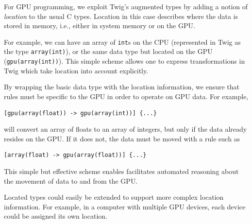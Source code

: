 For GPU programming, we exploit Twig's augmented types by adding a notion of
\emph{location} to the usual C types. Location in this case describes where the
data is stored in memory, i.e., either in system memory or on the GPU. 

For example, we can have an array of \texttt{int}s on the CPU (represented in
Twig as the type \texttt{array(int)}), or the same data type but located on the
GPU (\texttt{gpu(array(int))}). This simple scheme allows one to express
transformations in Twig which take location into account explicitly.

By wrapping the basic data type with the location information, we ensure that
rules must be specific to the GPU in order to operate on GPU data. For example,

\begin{verbatim}
[gpu(array(float)) -> gpu(array(int))] {...}
\end{verbatim}

will convert an array of floats to an array of integers, but only if the data
already resides on the GPU. If it does not, the data must be moved with a rule
such as

\begin{verbatim}
[array(float) -> gpu(array(float))] {...}
\end{verbatim}

This simple but effective scheme enables facilitates automated reasoning about
the movement of data to and from the GPU.

Located types could easily be extended to support more complex location
information. For example, in a computer with multiple GPU devices, each device
could be assigned its own location.
